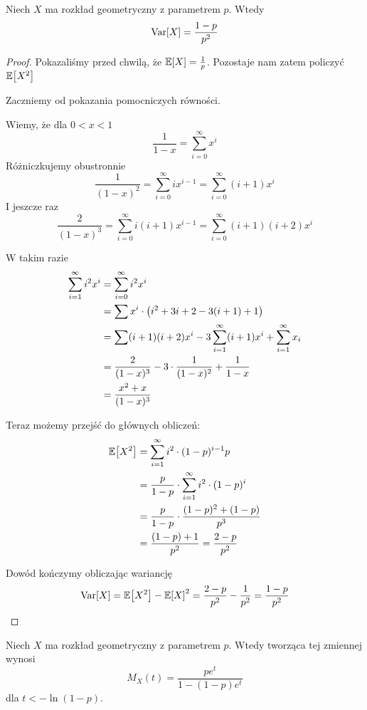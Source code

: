 \begin{theorem}
    Niech \( X \) ma rozkład geometryczny z parametrem \( p \). Wtedy
    \[
        \variance{X} = \frac{1 - p}{p^2}  
    \]
\end{theorem}
\begin{proof}
    Pokazaliśmy przed chwilą, że \( \expected{X} = \frac{1}{p} \). Pozostaje nam zatem policzyć \( \expected{X^2} \)
    
    Zaczniemy od pokazania pomocniczych równości. 
    
    Wiemy, że dla \( 0 < x < 1 \) 
    \[
        \frac{1}{1-x} = \sum_{i=0}^\infty x^i
    \]
    Różniczkujemy obustronnie
    \[
        \frac{1}{(1-x)^2} = \sum_{i=0}^\infty i x^{i-1} = \sum_{i=0}^\infty (i+1)x^i
    \]
    I jeszcze raz
    \[
        \frac{2}{(1-x)^3} = \sum_{i=0}^\infty i (i+1) x^{i-1} 
        = \sum_{i=0}^\infty (i+1)(i+2)x^i
    \]
    
    W takim razie
    \begin{align*}
            \sum_{i=1}^\infty i^2 x^i &= \sum_{i=0}^\infty i^2 x^i \\
            &= \sum x^i \cdot \left(i^2 + 3i + 2 - 3(i + 1) + 1\right) \\
            &= \sum (i+1)(i+2)x^i - 3\sum_{i=1}^\infty (i+1)x^i + \sum_{i=1}^\infty x_i \\
            &= \frac{2}{(1-x)^3} - 3\cdot\frac{1}{(1-x)^2} + \frac{1}{1-x} \\
            &= \frac{x^2 + x}{(1-x)^3}
    \end{align*}
    
    Teraz możemy przejść do głównych obliczeń:
    \begin{align*}
        \expected{X^2}
            &= \sum_{i=1}^\infty i^2 \cdot (1-p)^{i-1} p \\
            &= \frac{p}{1 - p} \cdot \sum_{i=1}^\infty i^2 \cdot (1-p)^i \\
            &= \frac{p}{1-p}\cdot\frac{(1-p)^2 + (1-p)}{p^3} \\
            &= \frac{(1-p) + 1}{p^2} = \frac{2 - p}{p^2}
    \end{align*}
    
    Dowód kończymy obliczając wariancję 
    \[
        \variance{X} = \expected{X^2} - \expected{X}^2 = \frac{2-p}{p^2} - \frac{1}{p^2} = \frac{1-p}{p^2}
    \]
\end{proof}

\begin{theorem}
    Niech \( X \) ma rozkład geometryczny z parametrem \( p \). Wtedy tworząca tej zmiennej wynosi
    \[
        M_X(t) = \frac{pe^t}{1 - (1-p)e^t}
    \]
    dla \( t < -\ln (1-p) \).
\end{theorem}

